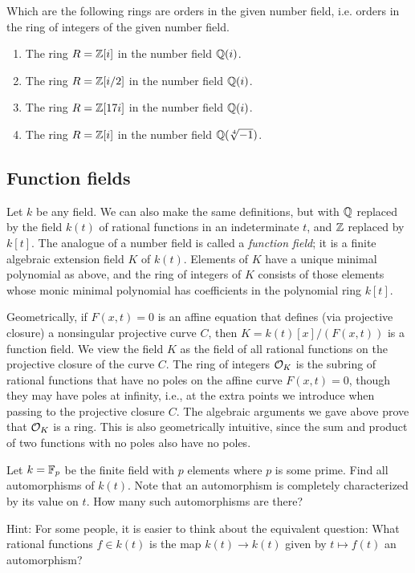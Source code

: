 \begin{exercise}
	Which are the following rings are orders in the given
	number field, i.e. orders in the ring of integers of the
	given number field.
	\begin{enumerate}
	\item The ring $R = \mathbb{Z}[i]$ in the number field $\mathbb{Q}(i)$.
	\item The ring $R = \mathbb{Z}[i/2]$ in the number field $\mathbb{Q}(i)$.
	\item The ring $R = \mathbb{Z}[17i]$ in the number field $\mathbb{Q}(i)$.
	\item The ring $R = \mathbb{Z}[i]$ in the number field $\mathbb{Q}(\sqrt[4]{-1})$.
	\end{enumerate}
\end{exercise}

\subsection{Function fields}
Let $k$ be any field.  We can also make the same definitions, but with $\mathbb{Q}$
replaced by the field $k(t)$ of rational functions in an indeterminate
$t$, and $\mathbb{Z}$ replaced by $k[t]$.
The analogue of a number field is called a {\em function field}; it is
a finite algebraic extension field $K$ of $k(t)$.  Elements of $K$
have a unique minimal polynomial as above, and the ring of integers of
$K$ consists of those elements whose monic minimal polynomial has
coefficients in the polynomial ring $k[t]$.  

Geometrically, if $F(x,t)=0$ is an affine equation that defines (via
projective closure) a nonsingular projective curve $C$, then
$K=k(t)[x]/(F(x,t))$ is a function field.  We view the field $K$ as
the field of all rational functions on the projective closure of the
curve $C$.  The ring of integers $\mathcal{O}_K$ is the subring of rational
functions that have no poles on the affine curve $F(x,t)=0$, though
they may have poles at infinity, i.e., at the extra points we
introduce when passing to the projective closure $C$.  The algebraic
arguments we gave above prove that $\mathcal{O}_K$ is a ring.  This is also
geometrically intuitive, since the sum and product of two functions
with no poles also have no poles.

\begin{exercise}
	Let $k = \mathbb{F}_p$ be the finite field with $p$ elements where $p$ is some prime. Find all automorphisms of $k(t)$. Note that an automorphism is completely characterized by its value on $t$. How many such automorphisms are there?
	
	Hint: For some people, it is easier to think about the equivalent question: What rational functions $f\in k(t)$ is the map $k(t)\to k(t)$ given by $t\mapsto f(t)$ an automorphism?
\end{exercise}

